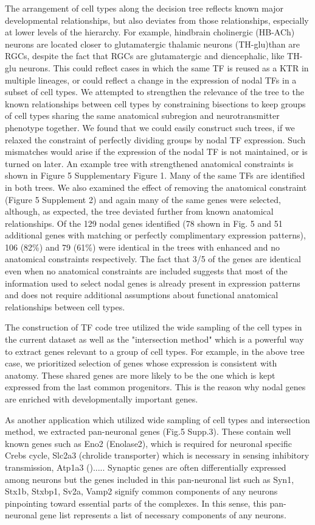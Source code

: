 The arrangement of cell types along the decision tree reflects known major developmental relationships, but also deviates from those relationships, especially at lower levels of the hierarchy. For example, hindbrain cholinergic (HB-ACh) neurons are located closer to glutamatergic thalamic neurons (TH-glu)than are RGCs, despite the fact that RGCs are glutamatergic and diencephalic, like TH-glu neurons. This could reflect cases in which the same TF is reused as a KTR in multiple lineages, or could reflect a change in the expression of nodal TFs in a subset of cell types. We attempted to strengthen the relevance of the tree to the known relationships between cell types by constraining bisections to keep groups of cell types sharing the same anatomical subregion and neurotransmitter phenotype together. We found that we could easily construct such trees, if we relaxed the constraint of perfectly dividing groups by nodal TF expression. Such mismatches would arise if the expression of the nodal TF is not maintained, or is turned on later. An example tree with strengthened anatomical constraints is shown in Figure 5 Supplementary Figure 1. Many of the same TFs are identified in both trees. We also examined the effect of removing the anatomical constraint (Figure 5 Supplement 2) and again many of the same genes were selected, although, as expected, the tree deviated further from known anatomical relationships. Of the 129 nodal genes identified (78 shown in Fig. 5 and 51 additional genes with matching or perfectly complimentary expression patterns), 106 (82\%) and 79 (61\%) were identical in the trees with enhanced and no anatomical constraints respectively. The fact that 3/5 of the genes are identical even when no anatomical constraints are included suggests that most of the information used to select nodal genes is already present in expression patterns and does not require additional assumptions about functional anatomical relationships between cell types.

The construction of TF code tree utilized the wide sampling of the cell types in the current dataset as well as the "intersection method" which is a powerful way to extract genes relevant to a group of cell types. For example, in the above tree case, we prioritized selection of genes whose expression is consistent with anatomy. These shared genes are more likely to be the one which is kept expressed from the last common progenitors. This is the reason why nodal genes are enriched with developmentally important genes.

As another application which utilized wide sampling of cell types and intersection method, we  extracted pan-neuronal genes (Fig.5 Supp.3). These contain well known genes such as Eno2 (Enolase2), which is required for neuronal specific Crebs cycle, Slc2a3 (chrolide transporter) which is necessary in sensing inhibitory transmission, Atp1a3 ().....  Synaptic genes are often differentially expressed among neurons but the genes included in this pan-neuronal list such as Syn1, Stx1b, Stxbp1, Sv2a, Vamp2 signify common components of any neurons pinpointing toward essential parts of the complexes. In this sense, this pan-neuronal gene list represents a list of necessary components of any neurons.

